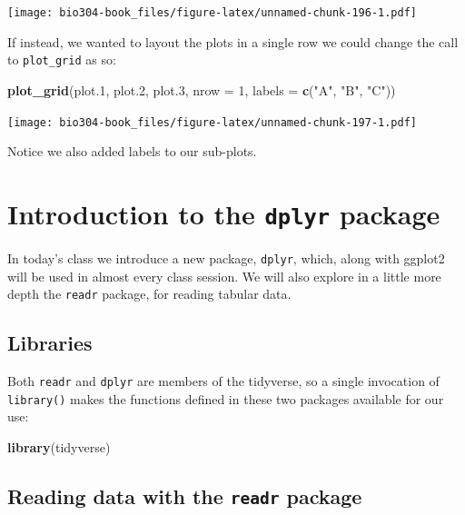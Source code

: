 \documentclass[]{book}
\newenvironment{Shaded}{\begin{snugshade}}{\end{snugshade}}
\newcommand{\DataTypeTok}[1]{\textcolor[rgb]{0.13,0.29,0.53}{#1}}
\newcommand{\DecValTok}[1]{\textcolor[rgb]{0.00,0.00,0.81}{#1}}
\newcommand{\FloatTok}[1]{\textcolor[rgb]{0.00,0.00,0.81}{#1}}
\newcommand{\KeywordTok}[1]{\textcolor[rgb]{0.13,0.29,0.53}{\textbf{#1}}}
\newcommand{\NormalTok}[1]{#1}
\newcommand{\StringTok}[1]{\textcolor[rgb]{0.31,0.60,0.02}{#1}}
\theoremstyle{definition}
\theoremstyle{definition}
\theoremstyle{definition}
\theoremstyle{remark}
\begin{document}
\texttt{[image: bio304-book\_files/figure-latex/unnamed-chunk-196-1.pdf]}

If instead, we wanted to layout the plots in a single row we could
change the call to \texttt{plot\_grid} as so:

\begin{Shaded}
\begin{Highlighting}[]
\KeywordTok{plot_grid}\NormalTok{(plot}\FloatTok{.1}\NormalTok{, plot}\FloatTok{.2}\NormalTok{, plot}\FloatTok{.3}\NormalTok{, }
          \DataTypeTok{nrow =} \DecValTok{1}\NormalTok{, }\DataTypeTok{labels =} \KeywordTok{c}\NormalTok{(}\StringTok{"A"}\NormalTok{, }\StringTok{"B"}\NormalTok{, }\StringTok{"C"}\NormalTok{))}
\end{Highlighting}
\end{Shaded}

\texttt{[image: bio304-book\_files/figure-latex/unnamed-chunk-197-1.pdf]}

Notice we also added labels to our sub-plots.

\hypertarget{introduction-to-the-dplyr-package}{%
\chapter{\texorpdfstring{Introduction to the \texttt{dplyr}
package}{Introduction to the dplyr package}}\label{introduction-to-the-dplyr-package}}

In today's class we introduce a new package, \texttt{dplyr}, which,
along with ggplot2 will be used in almost every class session. We will
also explore in a little more depth the \texttt{readr} package, for
reading tabular data.

\hypertarget{libraries-1}{%
\section{Libraries}\label{libraries-1}}

Both \texttt{readr} and \texttt{dplyr} are members of the tidyverse, so
a single invocation of \texttt{library()} makes the functions defined in
these two packages available for our use:

\begin{Shaded}
\begin{Highlighting}[]
\KeywordTok{library}\NormalTok{(tidyverse)  }
\end{Highlighting}
\end{Shaded}

\hypertarget{reading-data-with-the-readr-package}{%
\section{\texorpdfstring{Reading data with the \texttt{readr}
package}{Reading data with the readr package}}\label{reading-data-with-the-readr-package}}
\end{document}
